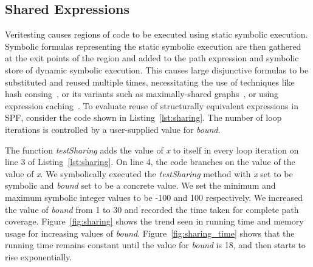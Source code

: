 \subsection{Shared Expressions}
%
Veritesting causes regions of code to be executed using static symbolic execution.
%
Symbolic formulas representing the static symbolic execution are then gathered at the exit points of the region and added to the path expression and symbolic store of dynamic symbolic execution.
%
This causes large disjunctive formulas to be substituted and reused multiple times, necessitating the use of techniques like hash consing~\cite{hashconsing}, or its variants such as maximally-shared graphs~\cite{babic}, or using expression caching~\cite{green}.
%
To evaluate reuse of structurally equivalent expressions in SPF, consider the code shown in Listing~\ref{lst:sharing}.
%
The number of loop iterations is controlled by a user-supplied value for \textit{bound}.
%
%

The function \textit{testSharing} adds the value of \textit{x} to itself in every loop iteration on line 3 of Listing~\ref{lst:sharing}.
%
On line 4, the code branches on the value of the value of \textit{x}.
%
We symbolically executed the \textit{testSharing} method with \textit{x} set to be symbolic and \textit{bound} set to be a concrete value.
%
We set the minimum and maximum symbolic integer values to be -100 and 100 respectively.
%
We increased the value of \textit{bound} from 1 to 30 and recorded the time taken for complete path coverage.
%
Figure~\ref{fig:sharing} shows the trend seen in running time and memory
usage for increasing values of \textit{bound}.
%
Figure~\ref{fig:sharing_time} shows that the running time remains constant until the value for \textit{bound} is 18, and then starts to rise exponentially.
%
%
